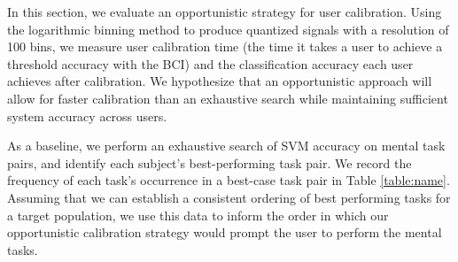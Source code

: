 In this section, we evaluate an opportunistic strategy for user calibration. Using the logarithmic binning method to produce quantized signals with a resolution of 100 bins, we measure user calibration time (the time it takes a user to achieve a threshold accuracy with the BCI) and the classification accuracy each user achieves after calibration. We hypothesize that an opportunistic approach will allow for faster calibration than an exhaustive search while maintaining sufficient system accuracy across users.



As a baseline, we perform an exhaustive search of SVM accuracy on mental task pairs, and identify each subject's best-performing task pair. We record the frequency of each task's occurrence in a best-case task pair in Table \ref{table:name}. Assuming that we can establish a consistent ordering of best performing tasks for a target population, we use this data to inform the order in which our opportunistic calibration strategy would prompt the user to perform the mental tasks.


